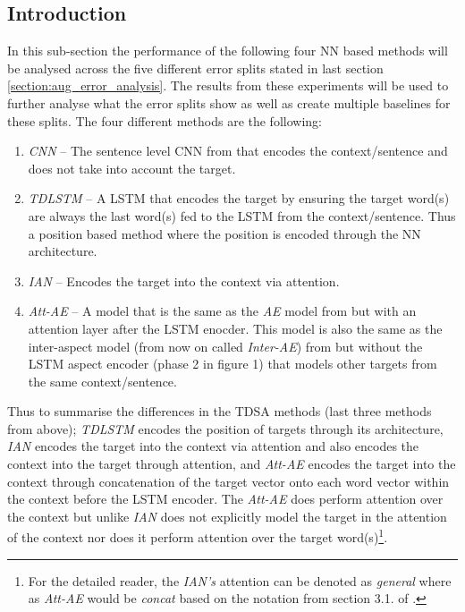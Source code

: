 \subsection{Introduction}
\label{section:aug_method_performance_intro}
In this sub-section the performance of the following four NN based methods will be analysed across the five different error splits stated in last section \ref{section:aug_error_analysis}. The results from these experiments will be used to further analyse what the error splits show as well as create multiple baselines for these splits. The four different methods are the following: 
\begin{enumerate}
    \item \textit{CNN} -- The sentence level CNN from \citet{kim-2014-convolutional} that encodes the context/sentence and does not take into account the target.
    \item \textit{TDLSTM} \citep{tang-etal-2016-effective} -- A LSTM that encodes the target by ensuring the target word(s) are always the last word(s) fed to the LSTM from the context/sentence. Thus a position based method where the position is encoded through the NN architecture.
    \item \textit{IAN} \citep{ma2017interactive} -- Encodes the target into the context via attention.
    \item \textit{Att-AE} -- A model that is the same as the \textit{AE} model from \citet{wang-etal-2016-attention} but with an attention layer after the LSTM enocder. This model is also the same as the inter-aspect model (from now on called \textit{Inter-AE}) from \citet{hazarika-etal-2018-modeling} but without the LSTM aspect encoder (phase 2 in figure 1) that models other targets from the same context/sentence.  
\end{enumerate}
Thus to summarise the differences in the TDSA methods (last three methods from above); \textit{TDLSTM} encodes the position of targets through its architecture, \textit{IAN} encodes the target into the context via attention and also encodes the context into the target through attention, and \textit{Att-AE} encodes the target into the context through concatenation of the target vector onto each word vector within the context before the LSTM encoder. The \textit{Att-AE} does perform attention over the context but unlike \textit{IAN} does not explicitly model the target in the attention of the context nor does it perform attention over the target word(s)\footnote{For the detailed reader, the \textit{IAN's} attention can be denoted as \textit{general} where as \textit{Att-AE} would be \textit{concat} based on the notation from section 3.1. of \citet{luong-etal-2015-effective}.}.

